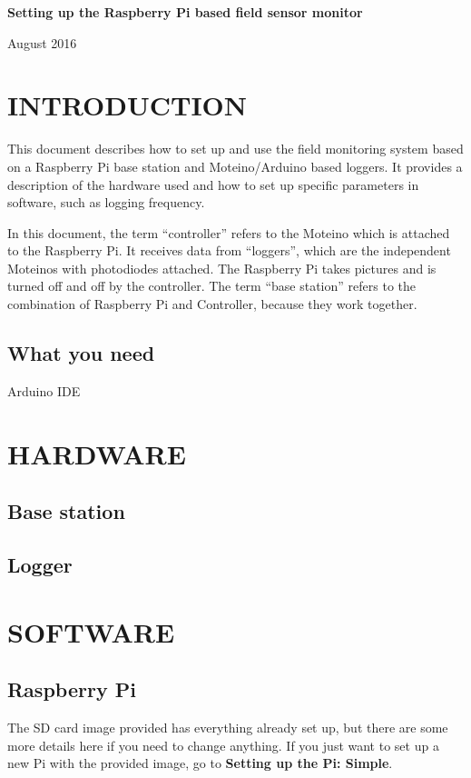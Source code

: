 \documentclass[10pt]{article}
\begin{document}
\begin{center}
\textbf{Setting up the Raspberry Pi based field sensor monitor}

August 2016
\end{center}
\newpage

\tableofcontents
\newpage

\section{INTRODUCTION}
This document describes how to set up and use the field monitoring system based on a Raspberry Pi base station and Moteino/Arduino based loggers. It provides a 
description of the hardware used and how to set up specific parameters in software, such as logging frequency. \break

In this document, the term ``controller'' refers to the Moteino which is attached to the Raspberry Pi. It receives data from ``loggers'', which are the independent
Moteinos with photodiodes attached. The Raspberry Pi takes pictures and is turned off and off by the controller. The term ``base station'' refers to the combination
of Raspberry Pi and Controller, because they work together.

\subsection{What you need}
Arduino IDE

\section{HARDWARE}

\subsection{Base station}

\subsection{Logger}

\section{SOFTWARE}

\subsection{Raspberry Pi}
The SD card image provided has everything already set up, but there are some more details here if you need to change anything. If you just want to set up a new Pi with the
provided image, go to \textbf{Setting up the Pi: Simple}. \break
\end{document}
